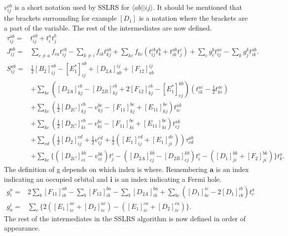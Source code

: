 \documentclass[graybox,sectrefs,envcountresetchap,open=right]{svmonodo}
\begin{document}
$v_{ij}^{ab}$ is a short notation used by SSLRS for $\langle ab || ij \rangle$. It should be mentioned that the brackets surrounding for example $[D_1]$ is a notation where the brackets are a part of the variable. The rest of the intermediates are now defined.
\begin{align}
\tau_{ij}^{ab} = & t_{ij}^{ab} + t_i^a t_j^b
\\ 
J_{ij}^{ab} = &
\sum_{c \not= a} f_{ca} t_{ij}^{cb}
- \sum_{k \not= i} f_{ik} t_{kj}^{ab}
+ \sum_{kc} f_{kc} (t_{ij}^{cb} t_k^b + t_{ik}^{ab} t_j^c )
+ \sum_c g_c^b t_{ij}^{ac} - \sum_k g_j^k t_{ik}^{ab} .
\end{align}
\begin{align}
S_{ij}^{ab} = & 
\frac{1}{2} [B_2]_{ij}^{ab}
- [E_1^*]_{ij}^{ab}
+ [D_{2A}]_{ab}^{ij}
+ [F_{12}]_{ab}^{ij} 
 \\ &
+ \sum_{kc} (
[D_{2A}]_{kj}^{cb} - [D_{2B}]_{kj}^{cb}
+ 2[F_{12}]_{kj}^{cb}
- [E_1^*]_{cj}^{kb} )
( t_{ik}^{ac} - \frac{1}{2} t_{ki}^{ac} )
\nonumber \\ &
+ \sum_{kc} (\frac{1}{2} [D_{2C}]_{kj}^{cb}
- v_{kj}^{bc} - [F_{11}]_{kj}^{bc} + [E_{11}]_{kj}^{bc}) t_{ic}^{ak}
\nonumber \\ &
+ \sum_{kc} (\frac{1}{2} [D_{2C}]_{ki}^{cb} - v_{ki}^{bc} - [F_{11}]_{ki}^{bc} 
+ [E_{11}]_{ki}^{bc} ) t_{cj}^{ak}
\nonumber \\ &
+ \sum_{cd} ( \frac{1}{2} [D_2]_{ij}^{cd} 
+ \frac{1}{2} v_{ij}^{cd} + \frac{1}{2} (
[E_1]_{ij}^{cd} + [E_1]_{ji}^{dc}))
\tau_{cd}^{ab}
\nonumber \\ &
+ \sum_{kc} \{
([D_{2C}]_{ci}^{kb} - v_{ci}^{bk}) t_j^c
- ([D_{2A}]_{cj}^{kb} 
- [D_{2B}]_{cj}^{kb} ) t_i^c
- ([D_1]_{ji}^{bk} + [F_2]_{ji}^{bk}) \} t_k^a .
\nonumber
\end{align}
The definition of g depends on which index is where. Remembering $\mathbf{a}$ is an index indicating an occupied orbital and $\mathbf{i}$ is an index indicating a Fermi hole.
\begin{align}
g_i^a = & 
2 \sum_b [F_{11}]_{ib}^{ab} 
- \sum_b [F_{12}]_{ib}^{ba}
- \sum_b [D_{2A}]_{ib}^{ba}
+ \sum_{bc} (
[D_1]_{bc}^{ic} - 2[D_1]_{cb}^{ib} ) t_c^a
\\
g_a^i = &
\sum_c \{2([E_1]_{ic}^{ac} + [D_2]_{ic}^{ac} )
- ([E_1]_{ic}^{ca} + [D_2]_{ic}^{ca}) \} .
\end{align}
The rest of the intermediates in the SSLRS algorithm is now defined in order of appearance. 
\end{document}
